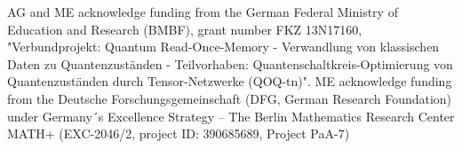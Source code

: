AG and ME acknowledge funding from the German Federal Ministry of Education and Research (BMBF), grant number FKZ 13N17160, "Verbundprojekt: Quantum Read-Once-Memory - Verwandlung von klassischen Daten zu Quantenzuständen - Teilvorhaben: Quanten{\allowbreak}schaltkreis-Optimierung von Quantenzuständen durch Tensor-Netzwerke (QOQ-tn)".
ME acknowledge funding from the Deutsche Forschungsgemeinschaft (DFG, German Research Foundation) under Germany´s Excellence Strategy – The Berlin Mathematics Research Center MATH+ (EXC-2046/2, project ID: 390685689, Project PaA-7)